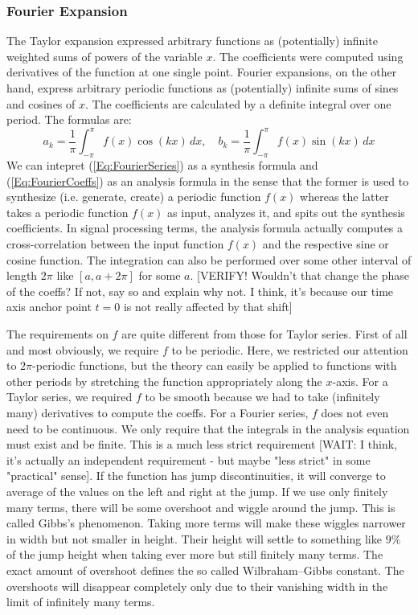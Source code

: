 
\subsubsection{Fourier Expansion}
The Taylor expansion expressed arbitrary functions as (potentially) infinite weighted sums of powers of the variable $x$. The coefficients were computed using derivatives of the function at one single point. Fourier expansions, on the other hand, express arbitrary periodic functions as (potentially) infinite sums of sines and cosines of $x$. The coefficients are calculated by a definite integral over one period. The formulas are:
\begin{equation}
\label{Eq:FourierCoeffs}	
 a_k = \frac{1}{\pi} \int_{-\pi}^{\pi} f(x) \cos(k x) \, dx, \quad
 b_k = \frac{1}{\pi} \int_{-\pi}^{\pi} f(x) \sin(k x) \, dx 
\end{equation}
We can intepret (\ref{Eq:FourierSeries}) as a synthesis formula and (\ref{Eq:FourierCoeffs}) as an analysis formula in the sense that the former is used to synthesize (i.e. generate, create) a periodic function $f(x)$ whereas the latter takes a periodic function $f(x)$ as input, analyzes it, and spits out the synthesis coefficients. In signal processing terms,  the analysis formula actually computes a cross-correlation between the input function $f(x)$ and the respective sine or cosine function. The integration can also be performed over some other interval of length $2\pi$ like $[a,a+2\pi]$ for some $a$. [VERIFY! Wouldn't that change the phase of the coeffs? If not, say so and explain why not. I think, it's because our time axis anchor point $t=0$ is not really affected by that shift] 

\medskip
The requirements on $f$ are quite different from those for Taylor series. First of all and most obviously, we require $f$ to be periodic. Here, we restricted our attention to $2 \pi$-periodic functions, but the theory can easily be applied to functions with other periods by stretching the function appropriately along the $x$-axis.  For a Taylor series, we required $f$ to be smooth because we had to take (infinitely many) derivatives to compute the coeffs. For a Fourier series, $f$ does not even need to be continuous. We only require that the integrals in the analysis equation must exist and be finite. This is a much less strict requirement [WAIT: I think, it's actually an independent requirement - but maybe "less strict" in some "practical" sense]. If the function has jump discontinuities, it will converge to average of the values on the left and right at the jump. If we use only finitely many terms, there will be some overshoot and wiggle around the jump. This is called Gibbs's phenomenon. Taking more terms will make these wiggles narrower in width but not smaller in height. Their height will settle to something like $9\%$ of the jump height when taking ever more but still finitely many terms. The exact amount of overshoot defines the so called Wilbraham–Gibbs constant. The overshoots will disappear completely only due to their vanishing width in the limit of infinitely many terms.

